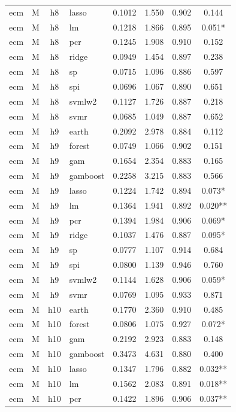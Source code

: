 \begin{ThreePartTable}
\begin{longtable}[t]{llclcccc}
ecm & M & h8 & lasso & 0.1012 & 1.550 & 0.902 & 0.144\\
ecm & M & h8 & lm & 0.1218 & 1.866 & 0.895 & 0.051*\\
ecm & M & h8 & pcr & 0.1245 & 1.908 & 0.910 & 0.152\\
ecm & M & h8 & ridge & 0.0949 & 1.454 & 0.897 & 0.238\\
ecm & M & h8 & sp & 0.0715 & 1.096 & 0.886 & 0.597\\
ecm & M & h8 & spi & 0.0696 & 1.067 & 0.890 & 0.651\\
ecm & M & h8 & svmlw2 & 0.1127 & 1.726 & 0.887 & 0.218\\
ecm & M & h8 & svmr & 0.0685 & 1.049 & 0.887 & 0.652\\
\addlinespace
ecm & M & h9 & earth & 0.2092 & 2.978 & 0.884 & 0.112\\
ecm & M & h9 & forest & 0.0749 & 1.066 & 0.902 & 0.151\\
ecm & M & h9 & gam & 0.1654 & 2.354 & 0.883 & 0.165\\
ecm & M & h9 & gamboost & 0.2258 & 3.215 & 0.883 & 0.566\\
ecm & M & h9 & lasso & 0.1224 & 1.742 & 0.894 & 0.073*\\
ecm & M & h9 & lm & 0.1364 & 1.941 & 0.892 & 0.020**\\
ecm & M & h9 & pcr & 0.1394 & 1.984 & 0.906 & 0.069*\\
ecm & M & h9 & ridge & 0.1037 & 1.476 & 0.887 & 0.095*\\
ecm & M & h9 & sp & 0.0777 & 1.107 & 0.914 & 0.684\\
ecm & M & h9 & spi & 0.0800 & 1.139 & 0.946 & 0.760\\
ecm & M & h9 & svmlw2 & 0.1144 & 1.628 & 0.906 & 0.059*\\
ecm & M & h9 & svmr & 0.0769 & 1.095 & 0.933 & 0.871\\
\addlinespace
ecm & M & h10 & earth & 0.1770 & 2.360 & 0.910 & 0.485\\
ecm & M & h10 & forest & 0.0806 & 1.075 & 0.927 & 0.072*\\
ecm & M & h10 & gam & 0.2192 & 2.923 & 0.883 & 0.148\\
ecm & M & h10 & gamboost & 0.3473 & 4.631 & 0.880 & 0.400\\
ecm & M & h10 & lasso & 0.1347 & 1.796 & 0.882 & 0.032**\\
ecm & M & h10 & lm & 0.1562 & 2.083 & 0.891 & 0.018**\\
ecm & M & h10 & pcr & 0.1422 & 1.896 & 0.906 & 0.037**\\

\end{longtable}
\end{ThreePartTable}
